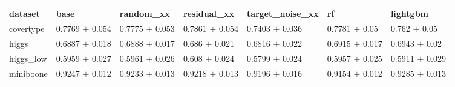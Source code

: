 \begin{tabular}{lllllll}
\toprule
dataset & base & random\_xx & residual\_xx & target\_noise\_xx & rf & lightgbm \\
\midrule
covertype & 0.7769 $\pm$ 0.054 & 0.7775 $\pm$ 0.053 & 0.7861 $\pm$ 0.054 & 0.7403 $\pm$ 0.036 & 0.7781 $\pm$ 0.05 & 0.762 $\pm$ 0.05 \\
higgs & 0.6887 $\pm$ 0.018 & 0.6888 $\pm$ 0.017 & 0.686 $\pm$ 0.021 & 0.6816 $\pm$ 0.022 & 0.6915 $\pm$ 0.017 & 0.6943 $\pm$ 0.02 \\
higgs\_low & 0.5959 $\pm$ 0.027 & 0.5961 $\pm$ 0.026 & 0.608 $\pm$ 0.024 & 0.5799 $\pm$ 0.024 & 0.5957 $\pm$ 0.025 & 0.5911 $\pm$ 0.029 \\
miniboone & 0.9247 $\pm$ 0.012 & 0.9233 $\pm$ 0.013 & 0.9218 $\pm$ 0.013 & 0.9196 $\pm$ 0.016 & 0.9154 $\pm$ 0.012 & 0.9285 $\pm$ 0.013 \\
\bottomrule
\end{tabular}
